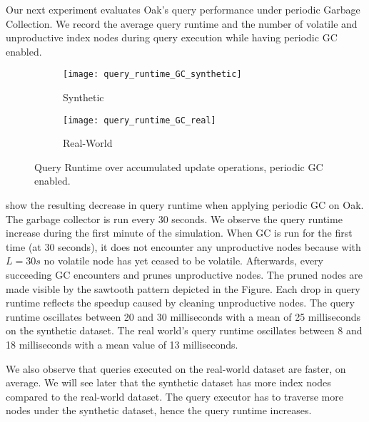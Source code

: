 \documentclass[abstracton,12pt]{scrartcl}
\theoremstyle{definition}
\begin{document}
Our next experiment evaluates Oak's query performance under periodic Garbage Collection.
We record the average query runtime and the number of volatile and unproductive 
index nodes during query execution while having periodic GC enabled.

\begin{figure}[h]
  \centering
  \begin{subfigure}{0.49\linewidth}
    \centering
    \caption{Synthetic}
    \texttt{[image: query\_runtime\_GC\_synthetic]}
    \label{fig:query_runtime_GC_synthetic}
  \end{subfigure}
  \begin{subfigure}{0.49\linewidth}
    \centering
    \caption{Real-World}
    \texttt{[image: query\_runtime\_GC\_real]}
    \label{fig:query_runtime_GC_real}
  \end{subfigure}
  \vspace{-0.8cm}
  \caption[Query Runtime over accumulated update operations, periodic GC enabled]{
  Query Runtime over accumulated update operations, periodic GC enabled.}
\end{figure}

 show the
resulting decrease in query runtime when applying periodic GC on Oak. The
garbage collector is run every 30 seconds. We observe the query runtime
increase during the first minute of the simulation. 
When GC is run for the first time (at 30 seconds), it does not encounter
any unproductive nodes because with $L=30s$ no volatile node has yet
ceased to be volatile. Afterwards, every succeeding GC encounters
and prunes unproductive nodes. The pruned nodes are made visible by the
sawtooth pattern depicted in the Figure. 
Each drop in query runtime reflects the speedup caused by cleaning unproductive
nodes. The query runtime oscillates between
20 and 30 milliseconds with a mean of 25 milliseconds on the synthetic dataset.
The real world's query runtime oscillates between 8 and 18 milliseconds with a mean
value of 13 milliseconds.

We also observe that queries executed on the real-world dataset are faster,
on average. We will see later that the synthetic dataset has more index
nodes compared to the real-world dataset. The query executor has to traverse
more nodes under the synthetic dataset, hence the query runtime increases.
\end{document}
